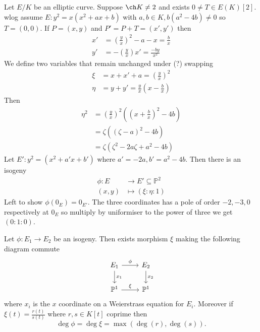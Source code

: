 \documentclass[a4paper]{article}
\theoremstyle{definition}
\theoremstyle{theorem}
\renewcommand*{\P}{\mathbb{P}}
\begin{document}
\begin{eg}
  Let \(E/K\) be an elliptic curve. Suppose \(\ch K \neq 2\) and exists \(0 \neq T \in E(K)[2]\). wlog assume \(E: y^2 = x(x^2 + ax + b)\) with \(a, b \in K, b(a^2 - 4b) \neq 0\) so \(T = (0, 0)\). If \(P = (x, y)\) and \(P' = P + T = (x', y')\) then
  \begin{align*}
    x' &= \left( \frac{y}{x} \right)^2 - a - x = \frac{b}{x} \\
    y' &= - \left( \frac{y}{x} \right) x' = \frac{-by}{x^2}
  \end{align*}
  We define two variables that remain unchanged under (?) swapping
  \begin{align*}
    \xi &= x + x' + a = \left( \frac{y}{x} \right)^2 \\
    \eta &= y + y' = \frac{y}{x} (x - \frac{b}{x})
  \end{align*}
  Then
  \begin{align*}
    \eta^2 &= \left( \frac{y}{x} \right)^2 ((x + \frac{b}{x})^2 - 4b) \\
           &= \zeta ((\zeta - a)^2 - 4b) \\
           &= \zeta (\zeta^2 - 2a\zeta + a^2 - 4b)
  \end{align*}
  Let \(E': y^2 = (x^2 + a'x + b')\) where \(a' = -2a, b' = a^2 - 4b\). Then there is an isogeny
  \begin{align*}
    \phi: E &\to E' \subseteq \P^2 \\
    (x, y) &\mapsto (\xi : \eta : 1)
  \end{align*}
  Left to show \(\phi(0_E) = 0_{E'}\). The three coordinates has a pole of order \(-2, -3, 0\) respectively at \(0_E\) so multiply by uniformiser to the power of three we get \((0:1:0)\).
\end{eg}

\begin{lemma}
  Let \(\phi: E_1 \to E_2\) be an isogeny. Then exists morphism \(\xi\) making the following diagram commute
  \[
    \begin{tikzcd}
      E_1 \ar[r, "\phi"] \ar[d, "x_1"] & E_2 \ar[d, "x_2"] \\
      \P^1 \ar[r, "\xi"] & \P^1
    \end{tikzcd}
  \]
  where \(x_i\) is the \(x\) coordinate on a Weierstrass equation for \(E_i\). Moreover if \(\xi(t) = \frac{r(t)}{s(t)}\) where \(r, s \in K[t]\) coprime then
  \[
    \deg \phi = \deg \xi = \max (\deg (r), \deg (s)).
  \]
\end{lemma}
\end{document}
